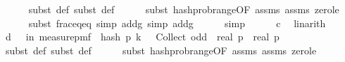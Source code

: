 \begin{isabellebody}
\ \ \ \ \isamarkupfalse%
\ {\isacharparenleft}{\kern0pt}subst\ {\isasymOmega}{\isacharunderscore}{\kern0pt}def{\isacharcomma}{\kern0pt}\ subst\ {\isasymOmega}{\isacharunderscore}{\kern0pt}def{\isacharparenright}{\kern0pt}\isanewline
\ \ \ \ \isamarkupfalse%
\ {\isacharparenleft}{\kern0pt}subst\ hash{\isacharunderscore}{\kern0pt}prob{\isacharunderscore}{\kern0pt}range{\isacharbrackleft}{\kern0pt}OF\ assms{\isacharparenleft}{\kern0pt}{}{\isacharparenright}{\kern0pt}\ assms{\isacharparenleft}{\kern0pt}{}{\isacharparenright}{\kern0pt}\ zero{\isacharunderscore}{\kern0pt}le{\isacharunderscore}{\kern0pt}{}{\isacharbrackright}{\kern0pt}{\isacharparenright}{\kern0pt}\isanewline
\ \ \ \ \isamarkupfalse%
\ {\isacharparenleft}{\kern0pt}subst\ frac{\isacharunderscore}{\kern0pt}eq{\isacharunderscore}{\kern0pt}eq{\isacharcomma}{\kern0pt}\ simp\ add{\isacharcolon}{\kern0pt}g{\isacharcomma}{\kern0pt}\ simp\ add{\isacharcolon}{\kern0pt}g{\isacharparenright}{\kern0pt}\isanewline
\ \ \ \ \isamarkupfalse%
\ {\isacharparenleft}{\kern0pt}simp{\isacharparenright}{\kern0pt}\isanewline
\ \ \ \ \isamarkupfalse%
\ c{\isacharunderscore}{\kern0pt}{}\ \isamarkupfalse%
\ linarith\isanewline
\ \ \isamarkupfalse%
\ d{\isacharunderscore}{\kern0pt}{}{\isacharcolon}{\kern0pt}\ {\isachardoublequoteopen}\ {\isasymP}{\isacharparenleft}{\kern0pt}{\isasymomega}\ in\ measure{\isacharunderscore}{\kern0pt}pmf\ {\isasymOmega}{\isachardot}{\kern0pt}\ hash\ p\ k\ {\isasymomega}\ {\isasymin}\ Collect\ odd{\isacharparenright}{\kern0pt}\ {\isacharequal}{\kern0pt}\ {\isacharparenleft}{\kern0pt}real\ p\ {\isacharminus}{\kern0pt}\ {}{\isacharparenright}{\kern0pt}{\isacharslash}{\kern0pt}{\isacharparenleft}{\kern0pt}{}{\isacharasterisk}{\kern0pt}real\ p{\isacharparenright}{\kern0pt}{\isachardoublequoteclose}\isanewline
\ \ \ \ \isamarkupfalse%
\ {\isacharparenleft}{\kern0pt}subst\ {\isasymOmega}{\isacharunderscore}{\kern0pt}def{\isacharcomma}{\kern0pt}\ subst\ {\isasymOmega}{\isacharunderscore}{\kern0pt}def{\isacharparenright}{\kern0pt}\isanewline
\ \ \ \ \isamarkupfalse%
\ {\isacharparenleft}{\kern0pt}subst\ hash{\isacharunderscore}{\kern0pt}prob{\isacharunderscore}{\kern0pt}range{\isacharbrackleft}{\kern0pt}OF\ assms{\isacharparenleft}{\kern0pt}{}{\isacharparenright}{\kern0pt}\ assms{\isacharparenleft}{\kern0pt}{}{\isacharparenright}{\kern0pt}\ zero{\isacharunderscore}{\kern0pt}le{\isacharunderscore}{\kern0pt}{}{\isacharbrackright}{\kern0pt}{\isacharparenright}{\kern0pt}\isanewline

\end{isabellebody}
